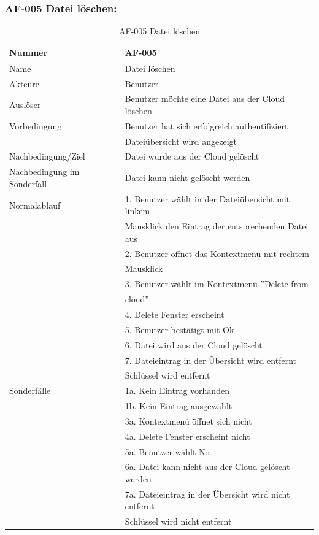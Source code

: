 \documentclass[13pt,a4paper,bibliography=totocnumbered,listof=totocnumbered]{scrartcl}
\begin{document}
\subsubsection{AF-005 Datei l\"oschen:}
\begin{table}[!h]
	\centering
	\begin{tabular}{|l|l|}
		\hline
		Nummer & AF-005\\
		\hline
		Name & Datei löschen\\
		\hline
		Akteure & Benutzer\\
		\hline
		Auslöser & Benutzer möchte eine Datei aus der Cloud löschen\\
		\hline
		Vorbedingung & Benutzer hat sich erfolgreich authentifiziert \\ & Dateiübersicht wird angezeigt\\
		\hline
		Nachbedingung/Ziel & Datei wurde aus der Cloud gelöscht \\
		\hline
		Nachbedingung im Sonderfall & Datei kann nicht gelöscht werden \\
		\hline
		Normalablauf & 1. Benutzer wählt in der Dateiübersicht mit linkem \\&Mausklick den Eintrag der entsprechenden Datei aus \\ & 2. Benutzer öffnet das Kontextmenü mit rechtem\\& Mausklick \\ & 3. Benutzer wählt im Kontextmenü ''Delete from \\&cloud'' \\ & 4. Delete Fenster erscheint \\ & 5. Benutzer bestätigt mit Ok \\  & 6. Datei wird aus der Cloud gelöscht \\ & 7. Dateieintrag in der Übersicht wird entfernt \\& Schlüssel wird entfernt \\
		\hline
		Sonderfälle & 1a. Kein Eintrag vorhanden\\& 1b. Kein Eintrag ausgewählt\\ & 3a. Kontextmenü öffnet sich nicht \\ & 4a. Delete Fenster erscheint nicht \\ & 5a. Benutzer wählt No \\ & 6a. Datei kann nicht aus der Cloud gelöscht werden \\ & 7a. Dateieintrag in der Übersicht wird nicht entfernt\\& Schlüssel wird nicht entfernt\\
		\hline
	\end{tabular}
	\caption{AF-005 Datei löschen}
	\label{tab:AF-005 Datei loeschen}
\end{table}
\pagebreak
\end{document}
